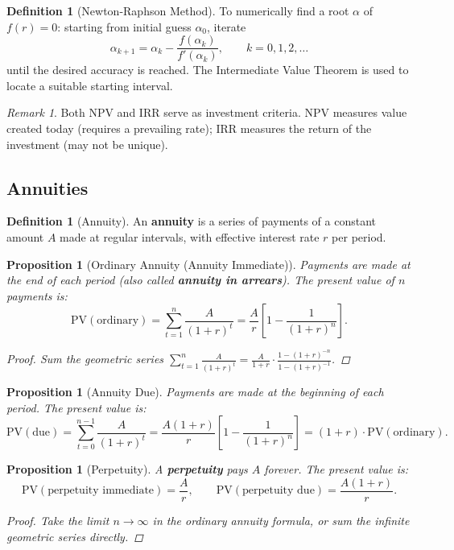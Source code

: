 \documentclass[12pt, a4paper]{article}
\theoremstyle{plain}
\newtheorem{proposition}[theorem]{Proposition}
\theoremstyle{definition}
\newtheorem{definition}[theorem]{Definition}
\theoremstyle{remark}
\newtheorem{remark}[theorem]{Remark}
\begin{document}
\begin{definition}[Newton-Raphson Method]
  To numerically find a root $\alpha$ of $f(r) = 0$: starting from initial guess $\alpha_0$, iterate
  \[
    \alpha_{k+1} = \alpha_k - \frac{f(\alpha_k)}{f'(\alpha_k)}, \qquad k = 0, 1, 2, \ldots
  \]
  until the desired accuracy is reached. The Intermediate Value Theorem is used to locate a suitable starting interval.
\end{definition}

\begin{remark}
  Both NPV and IRR serve as investment criteria. NPV measures value created today (requires a prevailing rate); IRR measures the return of the investment (may not be unique).
\end{remark}

\subsection{Annuities}

\begin{definition}[Annuity]
  An \textbf{annuity} is a series of payments of a constant amount $A$ made at regular intervals, with effective interest rate $r$ per period.
\end{definition}

\begin{proposition}[Ordinary Annuity (Annuity Immediate)]
  Payments are made at the \emph{end} of each period (also called \textbf{annuity in arrears}). The present value of $n$ payments is:
  \[
    \mathrm{PV}(\text{ordinary}) = \sum_{t=1}^n \frac{A}{(1+r)^t} = \frac{A}{r}\left[1 - \frac{1}{(1+r)^n}\right].
  \]
  \begin{proof}
    Sum the geometric series $\sum_{t=1}^n \frac{A}{(1+r)^t} = \frac{A}{1+r} \cdot \frac{1 - (1+r)^{-n}}{1 - (1+r)^{-1}}$.
  \end{proof}
\end{proposition}

\begin{proposition}[Annuity Due]
  Payments are made at the \emph{beginning} of each period. The present value is:
  \[
    \mathrm{PV}(\text{due}) = \sum_{t=0}^{n-1} \frac{A}{(1+r)^t} = \frac{A(1+r)}{r}\left[1 - \frac{1}{(1+r)^n}\right] = (1+r)\cdot\mathrm{PV}(\text{ordinary}).
  \]
\end{proposition}

\begin{proposition}[Perpetuity]
  A \textbf{perpetuity} pays $A$ forever. The present value is:
  \[
    \mathrm{PV}(\text{perpetuity immediate}) = \frac{A}{r}, \qquad \mathrm{PV}(\text{perpetuity due}) = \frac{A(1+r)}{r}.
  \]
  \begin{proof}
    Take the limit $n \to \infty$ in the ordinary annuity formula, or sum the infinite geometric series directly.
  \end{proof}
\end{proposition}
\end{document}
